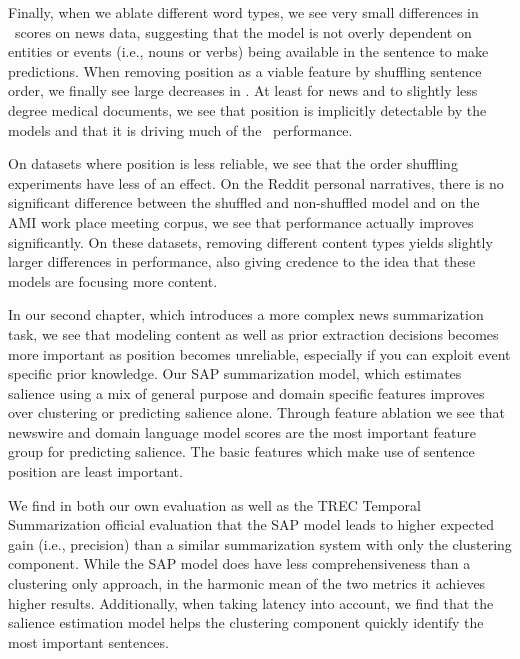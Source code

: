 Finally, when we ablate different word types, we see very small differences in
\rouge~scores on news data, suggesting that the model is not overly dependent
on entities or events (i.e., nouns or verbs) being available in the sentence to
make predictions. When removing position as a viable feature by shuffling
sentence order, we finally see large decreases in \rouge. At least for news and
to slightly less degree medical documents, we see that position is implicitly
detectable by the models and that it is driving much of the \rouge~performance.

On datasets where position is less reliable, we see that the order shuffling
experiments have less of an effect. On the Reddit personal narratives, there is
no significant difference between the shuffled and non-shuffled model and on
the AMI work place meeting corpus, we see that performance actually improves
significantly. On these datasets, removing different content types yields
slightly larger differences in performance, also giving credence to the idea
that these models are focusing more content.

In our second chapter, which introduces a more complex news summarization task,
we see that modeling content as well as prior extraction decisions becomes more
important as position becomes unreliable, especially if you can exploit event
specific prior knowledge.  Our SAP summarization model, which estimates
salience using a mix of general purpose and domain specific features improves
over clustering or predicting salience alone.  Through feature ablation we see
that newswire and domain language model scores are the most important feature
group for predicting salience.  The basic features which make use of sentence
position are least important.

We find in both our own evaluation as well as the TREC Temporal Summarization
official evaluation that the SAP model leads to higher expected gain (i.e.,
precision) than a similar summarization system with only the clustering
component.  While the SAP model does have less comprehensiveness than a
clustering only approach, in the harmonic mean of the two metrics it achieves
higher results. Additionally, when taking latency into account, we find that
the salience estimation model helps the clustering component quickly identify
the most important sentences. 

